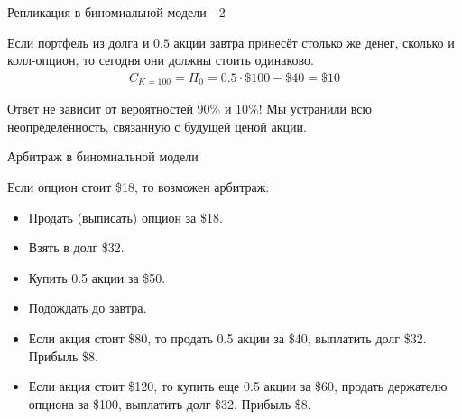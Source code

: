 \documentclass{beamer}
\begin{document}
\begin{frame}{Репликация в биномиальной модели - 2}
\centering
{}


\justify
Если портфель из долга и $0.5$ акции \alert{завтра} принесёт столько же денег, сколько и колл-опцион, то \alert{сегодня} они должны стоить одинаково.
\begin{align*}
C_{K=100} = \Pi_0 = 0.5 \cdot \$100 - \$40 = \$10
\end{align*}

Ответ не зависит от вероятностей 90\% и 10\%! Мы устранили всю неопределённость, связанную с будущей ценой акции.
\end{frame}



\begin{frame}{Арбитраж в биномиальной модели}
\centering
{}

\justify
Если опцион стоит \$18, то возможен арбитраж:
\begin{itemize}
\item Продать (выписать) опцион за \$18.
\item Взять в долг \$32.
\item Купить 0.5 акции за \$50.
\item Подождать до завтра.
\item Если акция стоит \$80, то продать 0.5 акции за \$40, выплатить долг \$32. Прибыль \$8.
\item Если акция стоит \$120, то купить еще 0.5 акции за \$60, продать держателю опциона за \$100, выплатить долг \$32. Прибыль \$8.
\end{itemize}
\end{frame}



\renewcommand{\drawOneStepBinomialTree}{
	\drawStockNode{$S_0$}{?}{0}{0}{S0_node}
	\drawStockNode{$S_0u$}{$V_u$}{4}{ 1}{Su_node}
	\drawStockNode{$S_0d$}{$V_d$}{4}{-1}{Sd_node}
	
	\drawStockLink{S0_node}{Su_node}{$p$}{south east}	
	\drawStockLink{S0_node}{Sd_node}{$1 - p$}{north east}
}
\end{document}

